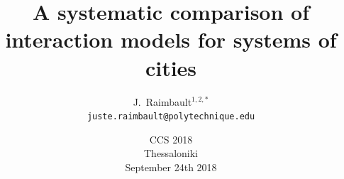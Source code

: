 \documentclass[english,11pt]{beamer}
\begin{document}
\title{A systematic comparison of interaction models for systems of cities}

\author{J.~Raimbault$^{1,2,\ast}$\\
\texttt{juste.raimbault@polytechnique.edu}
}




\date{CCS 2018\\\smallskip
Thessaloniki\\\smallskip
September 24th 2018
}

\frame{\maketitle}



\end{document}

